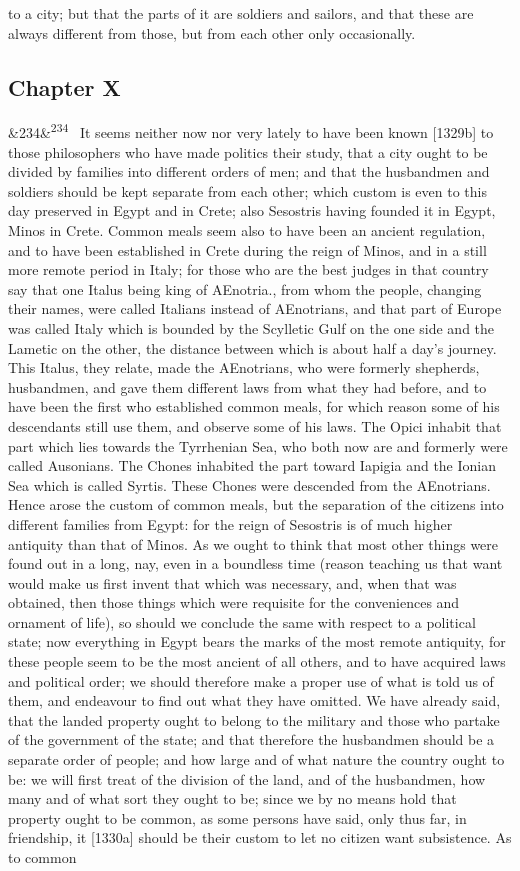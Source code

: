 \documentclass[12pt]{article}
\newcommand{\para}[1][]{\par\noindent\ifx&#1&\else\textsuperscript{\footnotesize #1}~\fi}
\begin{document}
to a city; but that the parts of it are soldiers and sailors, and that these are always different from those, but from each other only occasionally.

\subsection*{Chapter X}

\para[234] It seems neither now nor very lately to have been known [1329b] to those philosophers who have made politics their study, that a city ought to be divided by families into different orders of men; and that the husbandmen and soldiers should be kept separate from each other; which custom is even to this day preserved in Egypt and in Crete; also Sesostris having founded it in Egypt, Minos in Crete. Common meals seem also to have been an ancient regulation, and to have been established in Crete during the reign of Minos, and in a still more remote period in Italy; for those who are the best judges in that country say that one Italus being king of AEnotria., from whom the people, changing their names, were called Italians instead of AEnotrians, and that part of Europe was called Italy which is bounded by the Scylletic Gulf on the one side and the Lametic on the other, the distance between which is about half a day's journey. This Italus, they relate, made the AEnotrians, who were formerly shepherds, husbandmen, and gave them different laws from what they had before, and to have been the first who established common meals, for which reason some of his descendants still use them, and observe some of his laws. The Opici inhabit that part which lies towards the Tyrrhenian Sea, who both now are and formerly were called Ausonians. The Chones inhabited the part toward Iapigia and the Ionian Sea which is called Syrtis. These Chones were descended from the AEnotrians. Hence arose the custom of common meals, but the separation of the citizens into different families from Egypt: for the reign of Sesostris is of much higher antiquity than that of Minos. As we ought to think that most other things were found out in a long, nay, even in a boundless time (reason teaching us that want would make us first invent that which was necessary, and, when that was obtained, then those things which were requisite for the conveniences and ornament of life), so should we conclude the same with respect to a political state; now everything in Egypt bears the marks of the most remote antiquity, for these people seem to be the most ancient of all others, and to have acquired laws and political order; we should therefore make a proper use of what is told us of them, and endeavour to find out what they have omitted. We have already said, that the landed property ought to belong to the military and those who partake of the government of the state; and that therefore the husbandmen should be a separate order of people; and how large and of what nature the country ought to be: we will first treat of the division of the land, and of the husbandmen, how many and of what sort they ought to be; since we by no means hold that property ought to be common, as some persons have said, only thus far, in friendship, it [1330a] should be their custom to let no citizen want subsistence. As to common 
\end{document}
